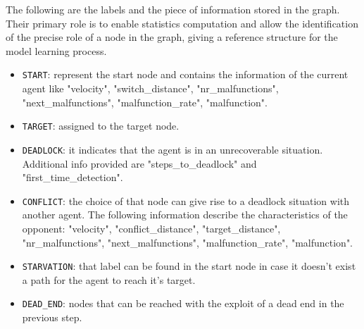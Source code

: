 The following are the labels and the piece of information stored in the graph. Their primary role is to enable statistics computation and allow the identification of the precise role of a node in the graph, giving a reference structure for the model learning process.
\begin{itemize}
    \item \texttt{START}: represent the start node and contains the information of the current agent like "velocity", "switch\_distance", "nr\_malfunctions", "next\_malfunctions", "malfunction\_rate", "malfunction".
    \item \texttt{TARGET}: assigned to the target node.
    \item \texttt{DEADLOCK}: it indicates that the agent is in an unrecoverable situation. Additional info provided are "steps\_to\_deadlock" and "first\_time\_detection".
    \item \texttt{CONFLICT}: the choice of that node can give rise to a deadlock situation with another agent. The following information describe the characteristics of the opponent: "velocity", "conflict\_distance", "target\_distance", "nr\_malfunctions", "next\_malfunctions", "malfunction\_rate", "malfunction".
    \item \texttt{STARVATION}: that label can be found in the start node in case it doesn't exist a path for the agent to reach it's target.
    \item \texttt{DEAD\_END}: nodes that can be reached with the exploit of a dead end in the previous step.
\end{itemize}



